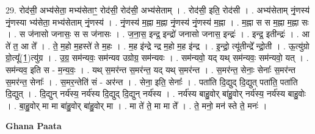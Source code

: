 \documentclass[17pt]{extarticle}
\begin{document}
29. रोद॑सी॒ अभ्य॑सेता॒ मभ्य॑सेताꣳ॒॒ रोद॑सी॒ रोद॑सी॒ अभ्य॑सेताम् । . रोद॑सी॒ इति॒ रोद॑सी । . अभ्य॑सेताम् नृं॒णस्य॑ नृं॒णस्या भ्य॑सेता॒ मभ्य॑सेताम् नृं॒णस्य॑ । . नृं॒णस्य॑ म॒ह्ना म॒ह्ना नृं॒णस्य॑ नृं॒णस्य॑ म॒ह्ना । . म॒ह्ना स स म॒ह्ना म॒ह्ना सः । . स ज॑नासो जनासः॒ स स ज॑नासः । . ज॒ना॒स॒ इन्द्र॒ इन्द्रो॑ जनासो जनास॒ इन्द्रः॑ । . इन्द्र॒ इतीन्द्रः॑ । . आ ते॑ त॒ आ ते᳚ । . ते॒ म॒हो म॒हस्ते॑ ते म॒हः । . म॒ह इ॑न्द्रे न्द्र म॒हो म॒ह इ॑न्द्र । . इ॒न्द्रो॒ त्यू॑तीन्द्रे᳚ न्द्रो॒ती । . ऊ॒त्यु॑ग्रो ग्रो॒त्यू᳚(1॒)त्यु॑ग्र । . उ॒ग्र॒ सम॑न्यवः॒ सम॑न्यव उग्रोग्र॒ सम॑न्यवः । . सम॑न्यवो॒ यद् यथ् सम॑न्यवः॒ सम॑न्यवो॒ यत् । . सम॑न्यव॒ इति स - म॒न्य॒वः॒ । . यथ् स॒मर॑न्त स॒मर॑न्त॒ यद् यथ् स॒मर॑न्त । . स॒मर॑न्त॒ सेनाः॒ सेनाः᳚ स॒मर॑न्त स॒मर॑न्त॒ सेनाः᳚ । . स॒मर॒न्तेति॑ सं - अर॑न्त । . सेना॒ इति॒ सेनाः᳚ । . पता॑ति दि॒द्युद् दि॒द्युत् पता॑ति॒ पता॑ति दि॒द्युत् । . दि॒द्युन् नर्य॑स्य॒ नर्य॑स्य दि॒द्युद् दि॒द्युन् नर्य॑स्य । . नर्य॑स्य बाहु॒वोर् बा॑हु॒वोर् नर्य॑स्य॒ नर्य॑स्य बाहु॒वोः । . बा॒हु॒वोर् मा मा बा॑हु॒वोर् बा॑हु॒वोर् मा । . मा ते॑ ते॒ मा मा ते᳚ । . ते॒ मनो॒ मन॑ स्ते ते॒ मनः॑ । \newline

\textbf{Ghana Paata } \newline
\end{document}
